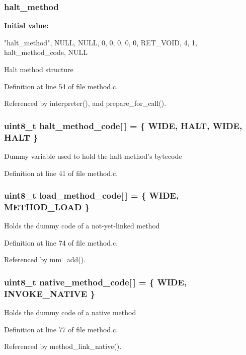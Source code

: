 \subsubsection[{halt\_\-method}]{ {\bf halt\_\-method}}\label{method_8c_a5d0cc5a987b03c6f65b3c21c2e75f966}
{\bfseries Initial value:}
\begin{DoxyCode}
 {
    "halt_method", 
    NULL, 
    NULL, 
    0, 
    0, 
    0, 
    0, 
    0, 
    RET_VOID, 
    4, 
    1, 
    halt_method_code, 
    { NULL } 
}
\end{DoxyCode}
Halt method structure 

Definition at line 54 of file method.c.



Referenced by interpreter(), and prepare\_\-for\_\-call().

\subsubsection[{halt\_\-method\_\-code}]{\setlength{\rightskip}{0pt plus 5cm}uint8\_\-t {\bf halt\_\-method\_\-code}[$\,$] = \{ WIDE, HALT, WIDE, HALT \}}\label{method_8c_ae6582852e0cf13938b20ea4152136004}
Dummy variable used to hold the halt method's bytecode 

Definition at line 41 of file method.c.

\subsubsection[{load\_\-method\_\-code}]{\setlength{\rightskip}{0pt plus 5cm}uint8\_\-t {\bf load\_\-method\_\-code}[$\,$] = \{ WIDE, METHOD\_\-LOAD \}\hspace{0.3cm}{\ttfamily  [static]}}\label{method_8c_a25e16b84c77b56ae6d2da8f790b261db}
Holds the dummy code of a not-\/yet-\/linked method 

Definition at line 74 of file method.c.



Referenced by mm\_\-add().

\subsubsection[{native\_\-method\_\-code}]{\setlength{\rightskip}{0pt plus 5cm}uint8\_\-t {\bf native\_\-method\_\-code}[$\,$] = \{ WIDE, INVOKE\_\-NATIVE \}\hspace{0.3cm}{\ttfamily  [static]}}\label{method_8c_adff00941a3934da466664581ba5b790a}
Holds the dummy code of a native method 

Definition at line 77 of file method.c.



Referenced by method\_\-link\_\-native().

